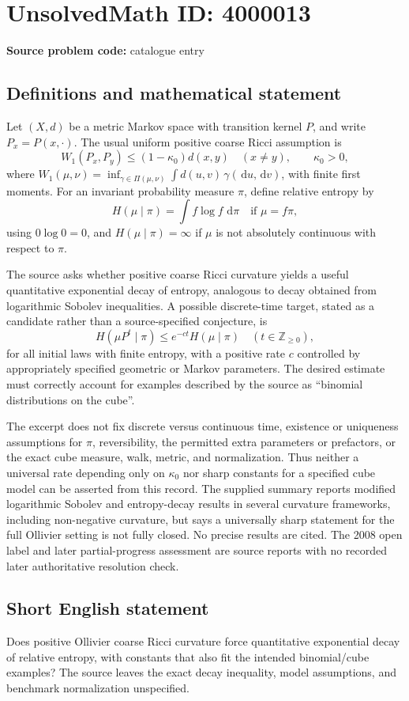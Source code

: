 \documentclass[11pt]{article}
\newcommand{\dd}{\,\mathrm{d}}
\begin{document}
\section*{UnsolvedMath ID: 4000013}
\textbf{Source problem code:} catalogue entry
\subsection{Definitions and mathematical statement}
Let \((X,d)\) be a metric Markov space with transition kernel \(P\), and write \(P_x=P(x,\cdot)\). The usual uniform positive coarse Ricci assumption is
\[
 W_1(P_x,P_y)\le(1-\kappa_0)d(x,y)\quad(x\ne y),\qquad\kappa_0>0,
\]
where \(W_1(\mu,\nu)=\inf_{\gamma\in\Pi(\mu,\nu)}\int d(u,v)\,\gamma(\dd u,\dd v)\), with finite first moments. For an invariant probability measure \(\pi\), define relative entropy by
\[
 H(\mu\mid\pi)=\int f\log f\,\dd\pi\quad\text{if }\mu=f\pi,
\]
using \(0\log0=0\), and \(H(\mu\mid\pi)=\infty\) if \(\mu\) is not absolutely continuous with respect to \(\pi\).

The source asks whether positive coarse Ricci curvature yields a useful quantitative exponential decay of entropy, analogous to decay obtained from logarithmic Sobolev inequalities. A possible discrete-time target, stated as a candidate rather than a source-specified conjecture, is
\[
 H(\mu P^t\mid\pi)\le e^{-ct}H(\mu\mid\pi)
 \quad(t\in\mathbb Z_{\ge0}),
\]
for all initial laws with finite entropy, with a positive rate \(c\) controlled by appropriately specified geometric or Markov parameters. The desired estimate must correctly account for examples described by the source as ``binomial distributions on the cube''.

The excerpt does not fix discrete versus continuous time, existence or uniqueness assumptions for \(\pi\), reversibility, the permitted extra parameters or prefactors, or the exact cube measure, walk, metric, and normalization. Thus neither a universal rate depending only on \(\kappa_0\) nor sharp constants for a specified cube model can be asserted from this record. The supplied summary reports modified logarithmic Sobolev and entropy-decay results in several curvature frameworks, including non-negative curvature, but says a universally sharp statement for the full Ollivier setting is not fully closed. No precise results are cited. The 2008 open label and later partial-progress assessment are source reports with no recorded later authoritative resolution check.
\subsection{Short English statement}
Does positive Ollivier coarse Ricci curvature force quantitative exponential decay of relative entropy, with constants that also fit the intended binomial/cube examples? The source leaves the exact decay inequality, model assumptions, and benchmark normalization unspecified.
\end{document}
